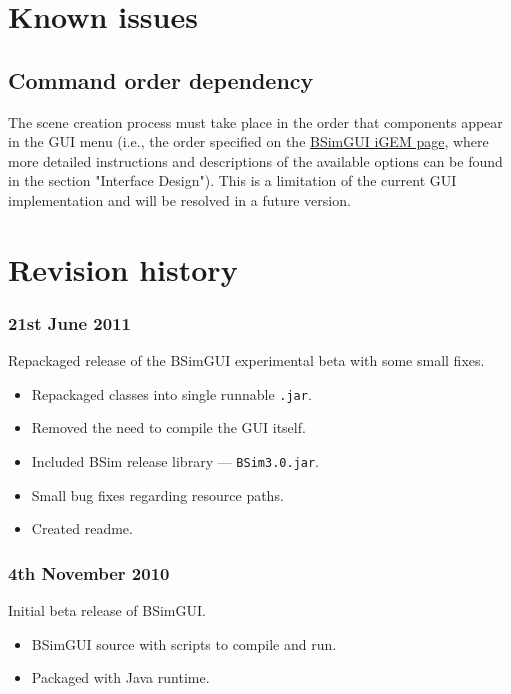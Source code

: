 \documentclass[a4paper,10pt]{article}
\newenvironment{revisionList}
{\begin{itemize}%
	\setlength{\itemsep}{0.1em}%
	\setlength{\parskip}{0pt}%
	\setlength{\parsep}{0pt}}
{\end{itemize}}
\begin{document}
\section{Known issues}

\subsection{Command order dependency}
The scene creation process must take place in the order that components appear in the GUI menu (i.e., the order specified on the \href{http://2010.igem.org/Team:BCCS-Bristol/Modelling/BSIM/GUI}{BSimGUI iGEM page}, where more detailed instructions and descriptions of the available options can be found in the section "Interface Design").
This is a limitation of the current GUI implementation and will be resolved in a future version.

\section{Revision history}
\subsubsection{21st June 2011}
Repackaged release of the BSimGUI experimental beta with some small fixes.
\begin{revisionList}
\item Repackaged classes into single runnable \texttt{.jar}.
\item Removed the need to compile the GUI itself.
\item Included BSim release library --- \texttt{BSim3.0.jar}.
\item Small bug fixes regarding resource paths.
\item Created readme.
\end{revisionList}

\subsubsection{4th November 2010}
Initial beta release of BSimGUI.
\begin{revisionList}
\item BSimGUI source with scripts to compile and run.
\item Packaged with Java runtime.
\end{revisionList}
\end{document}
